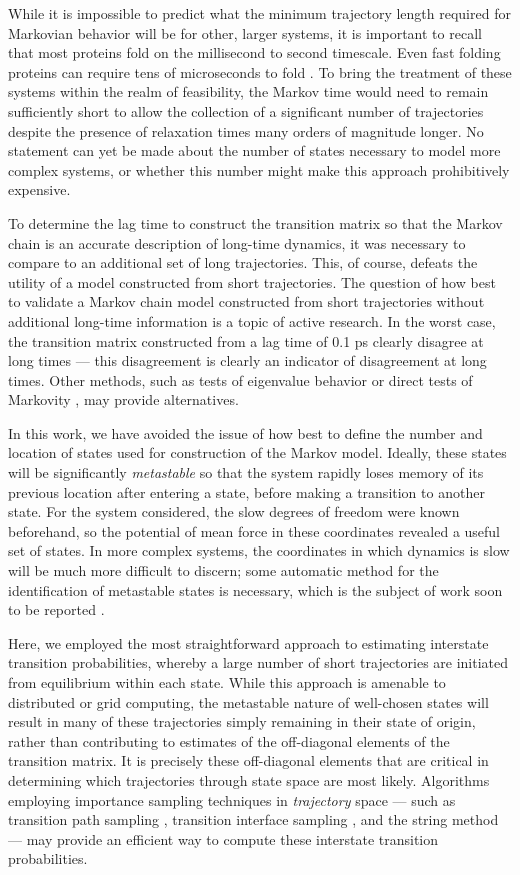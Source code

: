 While it is impossible to predict what the minimum trajectory length required for Markovian behavior will be for other, larger systems, it is important to recall that most proteins fold on the millisecond to second timescale.
Even fast folding proteins can require tens of microseconds to fold \cite{kubelka:2004a}.
To bring the treatment of these systems within the realm of feasibility, the Markov time would need to remain sufficiently short to allow the collection of a significant number of trajectories despite the presence of relaxation times many orders of magnitude longer.
No statement can yet be made about the number of states necessary to model more complex systems, or whether this number might make this approach prohibitively expensive.

To determine the lag time to construct the transition matrix so that the Markov chain is an accurate description of long-time dynamics, it was necessary to compare to an additional set of long trajectories.
This, of course, defeats the utility of a model constructed from short trajectories.
The question of how best to validate a Markov chain model constructed from short trajectories without additional long-time information is a topic of active research.
In the worst case, the transition matrix constructed from a lag time of 0.1 ps clearly disagree at long times --- this disagreement is clearly an indicator of disagreement at long times.
Other methods, such as tests of eigenvalue behavior \cite{swope:2004a} or direct tests of Markovity \cite{park:2006a}, may provide alternatives.

In this work, we have avoided the issue of how best to define the number and location of states used for construction of the Markov model.
Ideally, these states will be significantly \emph{metastable} so that the system rapidly loses memory of its previous location after entering a state, before making a transition to another state.
For the system considered, the slow degrees of freedom were known beforehand, so the potential of mean force in these coordinates revealed a useful set of states.
In more complex systems, the coordinates in which dynamics is slow will be much more difficult to discern; some automatic method for the identification of metastable states is necessary, which is the subject of work soon to be reported \cite{singhal:2006a}.

Here, we employed the most straightforward approach to estimating interstate transition probabilities, whereby a large number of short trajectories are initiated from equilibrium within each state.
While this approach is amenable to distributed or grid computing, the metastable nature of well-chosen states will result in many of these trajectories simply remaining in their state of origin, rather than contributing to estimates of the off-diagonal elements of the transition matrix.
It is precisely these off-diagonal elements that are critical in determining which trajectories through state space are most likely.
Algorithms employing importance sampling techniques in \emph{trajectory} space --- such as transition path sampling \cite{dellago:1998a}, transition interface sampling \cite{vanerp:2003a}, and the string method \cite{e:2002a} --- may provide an efficient way to compute these interstate transition probabilities.

